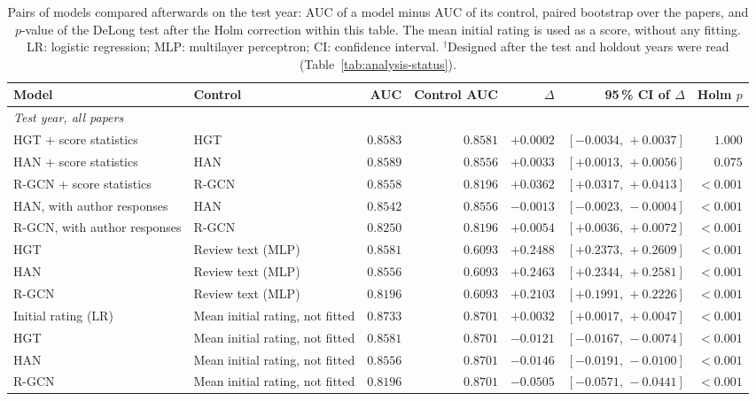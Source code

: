 \begin{table}[t]
\centering
\footnotesize
\setlength{\tabcolsep}{4pt}
\caption{Pairs of models compared afterwards on the test year: AUC of a model minus AUC of its control, paired bootstrap over the papers, and $p$-value of the DeLong test after the Holm correction within this table. The mean initial rating is used as a score, without any fitting. LR: logistic regression; MLP: multilayer perceptron; CI: confidence interval. $^{\dagger}$Designed after the test and holdout years were read (Table~\ref{tab:analysis-status}).}
\label{tab:sensitivity-pairs}
\begin{tabular}{@{}llrrrrr@{}}
\toprule
Model & Control & AUC & Control AUC & $\Delta$ & 95\,\% CI of $\Delta$ & Holm $p$ \\
\midrule
\multicolumn{7}{l}{\emph{Test year, all papers}} \\
HGT + score statistics & HGT & $0.8583$ & $0.8581$ & $+0.0002$ & $[-0.0034,\,+0.0037]$ & $1.000$ \\
HAN + score statistics & HAN & $0.8589$ & $0.8556$ & $+0.0033$ & $[+0.0013,\,+0.0056]$ & $0.075$ \\
R-GCN + score statistics & R-GCN & $0.8558$ & $0.8196$ & $+0.0362$ & $[+0.0317,\,+0.0413]$ & $<0.001$ \\
HAN, with author responses & HAN & $0.8542$ & $0.8556$ & $-0.0013$ & $[-0.0023,\,-0.0004]$ & $<0.001$ \\
R-GCN, with author responses & R-GCN & $0.8250$ & $0.8196$ & $+0.0054$ & $[+0.0036,\,+0.0072]$ & $<0.001$ \\
HGT & Review text (MLP) & $0.8581$ & $0.6093$ & $+0.2488$ & $[+0.2373,\,+0.2609]$ & $<0.001$ \\
HAN & Review text (MLP) & $0.8556$ & $0.6093$ & $+0.2463$ & $[+0.2344,\,+0.2581]$ & $<0.001$ \\
R-GCN & Review text (MLP) & $0.8196$ & $0.6093$ & $+0.2103$ & $[+0.1991,\,+0.2226]$ & $<0.001$ \\
Initial rating (LR) & Mean initial rating, not fitted & $0.8733$ & $0.8701$ & $+0.0032$ & $[+0.0017,\,+0.0047]$ & $<0.001$ \\
HGT & Mean initial rating, not fitted & $0.8581$ & $0.8701$ & $-0.0121$ & $[-0.0167,\,-0.0074]$ & $<0.001$ \\
HAN & Mean initial rating, not fitted & $0.8556$ & $0.8701$ & $-0.0146$ & $[-0.0191,\,-0.0100]$ & $<0.001$ \\
R-GCN & Mean initial rating, not fitted & $0.8196$ & $0.8701$ & $-0.0505$ & $[-0.0571,\,-0.0441]$ & $<0.001$ \\

\end{tabular}
\end{table}
